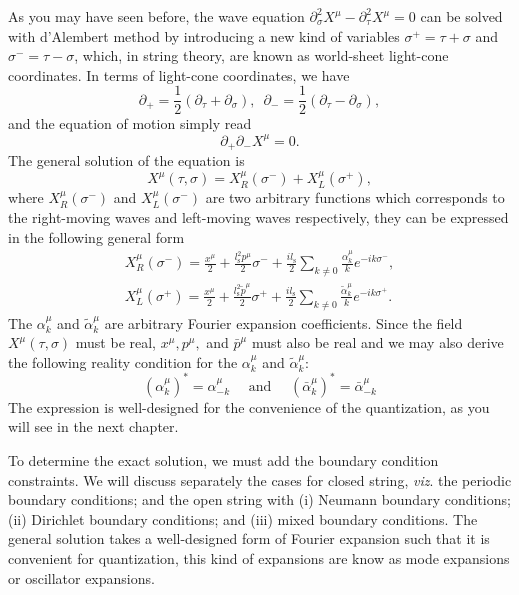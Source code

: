 \documentclass[graybox,envcountchap,sectrefs]{svmono}
\begin{document}
As you may have seen before, the wave equation
$\partial_{\sigma}^2X^{\mu}-\partial^2_{\tau}X^{\mu}=0$
can be solved with d'Alembert method by introducing a new kind of variables $\sigma^+=\tau+\sigma$ and $\sigma^-=\tau-\sigma$, which, in string theory, are known as world-sheet light-cone coordinates. 
In terms of light-cone coordinates, we have
\begin{equation}
\partial_+=\frac{1}{2}(\partial_{\tau}+\partial_{\sigma}), \,\,\,\partial_{-}=\frac{1}{2}(\partial_{\tau}-\partial_{\sigma}),
\end{equation}
and the equation of motion simply read
\begin{equation}
\partial_+\partial_{-}X^{\mu}=0.
\end{equation}
The general solution of the equation is 
\begin{equation}
X^{\mu}(\tau,\sigma)=X_R^{\mu}(\sigma^-)+X_L^{\mu}(\sigma^+),
\end{equation}
where $X_R^{\mu}(\sigma^-)$ and $X_L^{\mu}(\sigma^-)$ are two arbitrary functions which corresponds to the right-moving waves and left-moving waves respectively, they can be expressed in the following general form
\begin{align}
X_{R}^{\mu}(\sigma^-)=\frac{x^{\mu}}{2}+\frac{l_{\mathrm{s}}^{2} p^{\mu}}{2}\sigma^{-}+\frac{i l_{\mathrm{s}}}{{2}} \sum_{k \neq 0} \frac{\alpha_{k}^{\mu}}{k} e^{-i k\sigma^{-}}, \label{eq:generalsolution1}\\
X_{L}^{\mu}(\sigma^+)=\frac{x^{\mu}}{2}+\frac{l_{\mathrm{s}}^{2} \tilde{p}^{\mu}}{2}\sigma^{+}+\frac{i l_{\mathrm{s}}}{{2}} \sum_{k \neq 0} \frac{\tilde{\alpha}_{k}^{\mu}}{k} e^{-i k\sigma^{+}}.\label{eq:generalsolution2}
\end{align}
The $\alpha_{k}^{\mu}$ and $\tilde{\alpha}_{k}^{\mu}$ are arbitrary Fourier expansion coefficients. Since the field $X^{\mu}(\tau, \sigma)$ must be real, $x^{\mu}, p^{\mu},$ and $\bar{p}^{\mu}$ must also be real and we may also derive the following reality condition for the $\alpha_k^{\mu}$ and $\tilde{\alpha}_k^{\mu}$:
\begin{equation}
\left(\alpha_{k}^{\mu}\right)^{*}=\alpha_{-k}^{\mu} \quad \text { and } \quad\left(\bar{\alpha}_{k}^{\mu}\right)^{*}=\bar{\alpha}_{-k}^{\mu}
\end{equation}
The expression is well-designed for the convenience of the quantization, as you will see in the next chapter.

To determine the exact solution, we must add the boundary condition constraints. 
We will discuss separately the cases for closed string, \emph{viz}. the periodic boundary conditions; 
and the open string with  (i) Neumann boundary conditions; (ii) Dirichlet boundary conditions; and (iii) mixed boundary conditions. The general solution takes a well-designed form of Fourier expansion such that it is convenient for quantization, this kind of expansions are know as mode expansions or oscillator expansions. 
\end{document}
